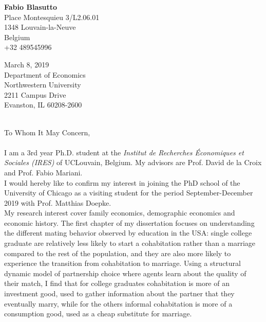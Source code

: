 \documentclass[12pt]{article}
\begin{document}
  {\parbox{\textwidth}{\raggedleft \textbf{Fabio Blasutto}\\ %
 Place Montesquieu 3/L2.06.01\\ %
 1348 Louvain-la-Neuve\\ %
 Belgium \\+32 489545996\\\vspace{0.2cm}}
  {\parbox{1.5\textwidth}{\raggedright March 8, 2019\\
  Department of Economics\\
Northwestern University\\
2211 Campus Drive\\
Evanston, IL 60208-2600}}
\vspace{0.5cm}\\
To Whom It May Concern,\\
\vspace{0.5cm}\\
I am a 3rd year Ph.D. student at the \textit{Institut de Recherches \'Economiques et Sociales (IRES)} of UCLouvain, Belgium. My advisors are Prof. David de la Croix and Prof. Fabio Mariani.\vspace{0.3cm}\\
I would hereby like to confirm my interest in joining the PhD school of the University of Chicago as a visiting student for the period September-December 2019 with Prof. Matthias Doepke.\vspace{0.3cm}\\
My research interest cover family economics, demographic economics and economic history. The first chapter of my dissertation focuses on understanding the different mating behavior observed by education in the USA: single college graduate are relatively less likely to start a cohabitation rather than a marriage compared to the rest of the population, and they are also more likely to experience the transition from cohabitation to marriage. Using a structural dynamic model of partnership choice where agents learn about the quality of their match, I find that for college graduates cohabitation is more of an investment good, used to gather information about the partner that they eventually marry, while for the others informal cohabitation is more of a consumption good, used as a cheap substitute for marriage.\vspace{0.3cm}\\
}
\end{document}
